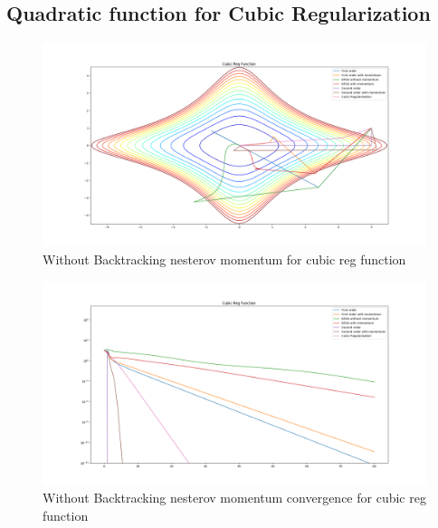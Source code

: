 \documentclass{article}
\begin{document}
\subsection{Quadratic function for Cubic Regularization}

\begin{figure}[H]
	\includegraphics[width=\linewidth]{../Images/cubicregularizationnesterov.png}
	\caption{Without Backtracking nesterov momentum for cubic reg function}
	\label{fig:Without Backtracking nesterov momentum for cubic reg function}
\end{figure}

\begin{figure}[H]
	\includegraphics[width=\linewidth]{../Images/cubicregularizationnesterov1.png}
	\caption{Without Backtracking nesterov momentum convergence for cubic reg function}
	\label{fig:Without Backtracking nesterov momentum convergence for cubic reg function}
\end{figure}
\end{document}
